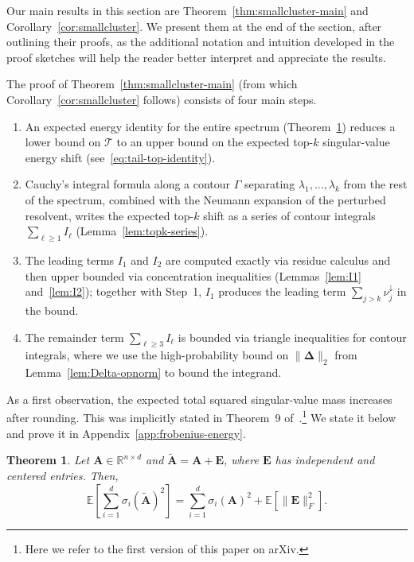 \documentclass{article}
\newcommand{\twonorm}[1]{\|#1\|_2}
\newcommand{\Ex}[1]{\mbox{}\mathbb{E}\left[#1\right]}
\newcommand{\R}{\mathbb{R}} %
\newcommand{\Ab}{\mathbf{A}}
\newcommand{\Eb}{\mathbf{E}}
\newcommand{\Abtil}{\tilde{\Ab}}
\newcommand{\Tcal}{\mathcal{T}}
\newtheorem{theorem}{Theorem}
\newcommand{\Deltab}{\boldsymbol{\Delta}}
\begin{document}
Our main results in this section are Theorem~\ref{thm:smallcluster-main} and Corollary~\ref{cor:smallcluster}. We present them at the end of the section, after outlining their proofs, as the additional notation and intuition developed in the proof sketches will help the reader better interpret and appreciate the results.

The proof of Theorem~\ref{thm:smallcluster-main} (from which Corollary~\ref{cor:smallcluster} follows) consists of four main steps.
\begin{enumerate}
    \item An expected energy identity for the entire spectrum (Theorem~\ref{thm:frobenius-energy}) reduces a lower bound on $\Tcal$ to an upper bound on the expected top-$k$ singular-value energy shift (see~\eqref{eq:tail-top-identity}).
    \item Cauchy's integral formula along a contour $\Gamma$ separating $\lambda_1,\ldots,\lambda_k$ from the rest of the spectrum, combined with the Neumann expansion of the perturbed resolvent, writes the expected top-$k$ shift as a series of contour integrals $\sum_{\ell\ge 1} I_\ell$ (Lemma~\ref{lem:topk-series}).
    \item The leading terms $I_1$ and $I_2$ are computed exactly via residue calculus and then upper bounded via concentration inequalities (Lemmas~\ref{lem:I1} and~\ref{lem:I2}); together with Step~1, $I_1$ produces the leading term $\sum_{j > k}\nu_j^\downarrow$ in the bound.
    \item The remainder term $\sum_{\ell\ge 3} I_\ell$ is bounded via triangle inequalities for contour integrals, where we use the high-probability bound on $\twonorm{\Deltab}$ from Lemma~\ref{lem:Delta-opnorm} to bound the integrand.
\end{enumerate}


As a first observation, the expected total squared singular-value mass increases after rounding. This was implicitly stated in Theorem~9 of~\citep{boutsikas2024small}.\footnote{Here we refer to the first version of this paper on arXiv.} We state it below and prove it in Appendix~\ref{app:frobenius-energy}.

\begin{theorem}\label{thm:frobenius-energy}
Let $\Ab \in \R^{n\times d}$ and $\Abtil = \Ab+\Eb$, where $\Eb$ has independent and centered entries. Then,
\begin{equation*}
    \Ex{\sum_{i=1}^{d}\sigma_i(\Abtil)^2} = \sum_{i=1}^{d}\sigma_i(\Ab)^2 + \Ex{\|\Eb\|_F^2}.
\end{equation*}
\end{theorem}
\end{document}
